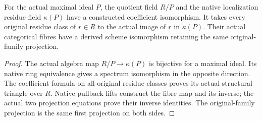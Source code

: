 \begin{lemma}
\label{lem:kn-arithmetic-canonical-quotient-residue}
\leanok
For the actual maximal ideal $P$, the quotient field $R/P$ and the native
localization residue field $\kappa(P)$ have a constructed coefficient
isomorphism.  It takes every original residue class of $r\in R$ to the
actual image of $r$ in $\kappa(P)$.  Their actual categorical fibres have a
derived scheme isomorphism retaining the same original-family projection.
\end{lemma}
\begin{proof}
The actual algebra map $R/P\to\kappa(P)$ is bijective for a maximal ideal.
Its native ring equivalence gives a spectrum isomorphism in the opposite
direction.  The coefficient formula on all original residue classes proves
its actual structural triangle over $R$.  Native pullback lifts construct
the fibre map and its inverse; the actual two projection equations prove
their inverse identities.  The original-family projection is the same
first projection on both sides.
\end{proof}

